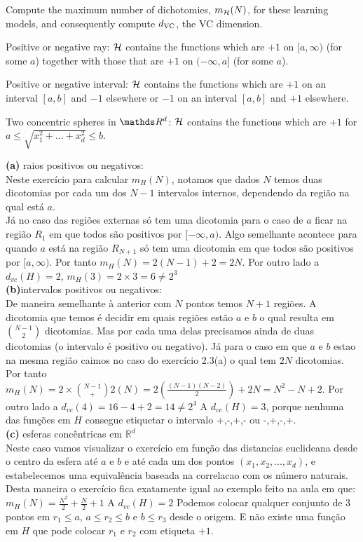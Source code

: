 \begin{enunciado}{3}
    Compute the maximum number of dichotomies, $m_{\mathcal{H}}(N)$, for these
    learning models, and consequently compute $d_{\text{VC}}$, the VC dimension.
    
     Positive or negative ray: $\mathcal{H}$ contains the functions
    which are $+1$ on $[a, \infty)$ (for some $a$) together with those
    that are $+1$ on $(-\infty, a]$ (for some $a$).
    
     Positive or negative interval: $\mathcal{H}$ contains the functions which are $+1$ on an interval $[a, b]$ and $-1$ elsewhere or $-1$ on an interval $[a, b]$ and $+1$ elsewhere.
    
     Two concentric spheres in $\conjR^d$: $\mathcal{H}$ contains the
    functions which are $+1$ for $a \le \sqrt{x_1^2 + \dots + x_d^2} \le b$.
\end{enunciado}

 \textbf{(a)} raios positivos ou negativos: \\
 Neste exercício para calcular $m_H(N)$, notamos que dados $N$
 temos duas dicotomias por cada um dos $N-1$ intervalos internos, dependendo 
 da região na qual está $a$.\\ 
 Já no caso das regiões externas só tem 
 uma dicotomia para o caso de $a$ ficar na região $R_1$ em que todos são
 positivos por  $[-\infty, a)$. Algo semelhante acontece para quando $a$ está na região $R_{N+1}$
 só tem uma dicotomia em que todos são positivos por $[a,\infty)$. 
 Por tanto  $m_H(N) = 2(N-1)+2 = 2N$. Por outro lado a $d_{vc}(H)=2$, $m_H(3)= 2\times 3 = 6 \neq 2^3$\\
  
\textbf{(b)}intervalos positivos ou negativos:\\
 De maneira semelhante à anterior com $N$ pontos temos $N+1$ regiões. A dicotomia
 que temos é decidir em quais regiões estão $a$ e $b$ o qual resulta em $\binom {N-1} {2}$ dicotomias.
 Mas por cada uma delas precisamos ainda de duas dicotomias (o intervalo é positivo ou negativo). 
Já para o caso em que $a$ e $b$ estao na mesma região caimos no caso do exercício 2.3(a) o qual tem $2N$ 
dicotomias.
 Por tanto $m_H(N) = 2\times \binom {N-1} +2(N) = 2 (\frac{(N-1)(N-2)}{2}) + 2N =
 N^2 - N + 2$.
 Por outro lado a $d_{vc}(4)= 16-4+2=14 \neq 2^4$
  A $d_{vc}(H)= 3$, porque nenhuma das funções em $H$ consegue etiquetar
  o intervalo +,-,+,- ou -,+,-,+.\\
 
\textbf{(c)} esferas concêntricas em $\mathbb{R}^d$\\
 
 Neste caso vamos visualizar o exercício em função  das distancias euclideana desde o centro da esfera
 até $a$ e $b$ e até cada um dos pontos $(x_1,x_2, ..., x_d)$, e estabelecemos uma equivalência baseada na correlacao 
 com os número naturais. Desta maneira o exercício fica exatamente igual ao exemplo feito na aula 
em que: $ m_H(N) =\frac{N^2}{2} + \frac{N}{2} + 1$
 A $d_{vc}(H)= 2$
 Podemos colocar qualquer conjunto de 3 pontos em $r_1 \leq a$,
 $a \leq r_2 \leq b$ e $b \leq r_3$ desde o origem. 
 E não existe uma função em $H$ que pode colocar $r_1$ e $r_2$ com etiqueta $+1$.
